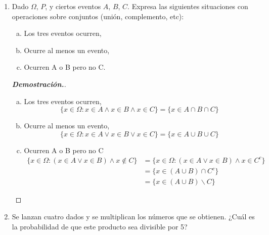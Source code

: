 \documentclass{article}
\begin{document}
\begin{enumerate}
\begin{mdframed}[
			linecolor=darkgray,
			backgroundcolor=pearl]
\begin{proof}[\textbf{Demostraci\'on.}]
				En resumen, para a) tenemos $3!$ casos, para el b) $0$, el c) tiene $3!/2! = 3$ (posiciones en las que B se encuentra antes de A). Finalmente, para d) tenemos $2! + 2! = 4$ casos (A no es segunda posici\'on). En total, $13$ casos en los que no obtenemos el mejor ba\~no, de $4! = 24$ posibles. Entonces,
				\[ 
					P(y = A) = 1 - P(y\neq A) = 1 - \frac{13}{24} = \frac{11}{24}.				
				\]
			\end{proof}
		\end{mdframed}
		\pagebreak		
		\item Dado $\Omega$, $P$, y ciertos eventos $A$, $B$, $C$. Expresa las siguientes situaciones con operaciones sobre conjuntos (uni\'on, complemento, etc):
		\begin{enumerate}[a)]
			\item Los tres eventos ocurren,
			\item Ocurre al menos un evento,
			\item Ocurren A o B pero no C.
		\end{enumerate}
		\begin{mdframed}[
			linecolor=darkgray,
			backgroundcolor=pearl]
			\begin{proof}[\textbf{Demostraci\'on.}]
				\begin{enumerate}[a)]
					
					\item Los tres eventos ocurren,
					\[ 
						\{x\in \Omega : x\in A \wedge x\in B\wedge x\in C\} = \{x\in A\cap B\cap C\}
					\]
					
					\item Ocurre al menos un evento,
					\[ 
						\{x\in \Omega : x\in A \vee x\in B\vee x\in C\} = \{x\in A\cup B\cup C\}
					\]
					\item Ocurren A o B pero no C
					\begin{align*}
						\{x\in \Omega : (x\in A \vee x\in B)\wedge x\notin C\} &= \{x\in \Omega : (x\in A \vee x\in B)\wedge x\in C^c\}\\
						&= \{x\in (A\cup B)\cap C^c\}\\
						&= \{x\in (A\cup B)\backslash C\}
					\end{align*}
				\end{enumerate}
			\end{proof}
		\end{mdframed}
		
		\vspace{12pt}
		
		\item Se lanzan cuatro dados y se multiplican los n\'umeros que se obtienen. ¿Cu\'al es la probabilidad de que este producto sea divisible por 5?
		

\end{enumerate}
\end{document}
